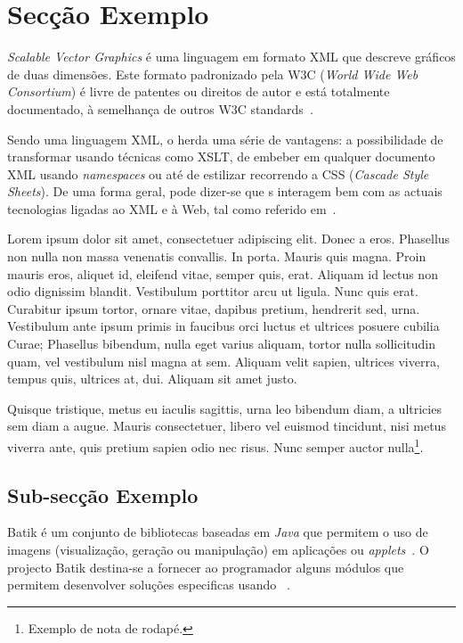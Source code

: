 \section{Secção Exemplo}\label{sec:dialecto}

\emph{Scalable Vector Graphics} é uma
linguagem em formato XML que descreve gráficos de duas dimensões. 
Este formato padronizado pela W3C (\emph{World Wide Web Consortium})
é livre de patentes ou direitos de autor e está totalmente
documentado, à semelhança de outros W3C
standards~\citep{kn:svgdoc}.

Sendo uma linguagem XML, o \svg{} herda uma série de vantagens: a
possibilidade de transformar \svg{} usando técnicas como
XSLT, de embeber \svg{} em qualquer documento
XML usando \textit{namespaces} ou até de  
estilizar \svg{} recorrendo a CSS (\emph{Cascade Style Sheets}). 
De uma forma geral, pode dizer-se que \svg{}s interagem bem com as
actuais tecnologias ligadas ao XML e à Web, tal como referido
em~\citep{kn:svgibm,kn:svgw3c}.

Lorem ipsum dolor sit amet, consectetuer adipiscing elit. Donec a
eros. Phasellus non nulla non massa venenatis convallis. In
porta. Mauris quis magna. Proin mauris eros, aliquet id, eleifend
vitae, semper quis, erat. Aliquam id lectus non odio dignissim
blandit. Vestibulum porttitor arcu ut ligula. Nunc quis
erat. Curabitur ipsum tortor, ornare vitae, dapibus pretium, hendrerit
sed, urna. Vestibulum ante ipsum primis in faucibus orci luctus et
ultrices posuere cubilia Curae; Phasellus bibendum, nulla eget varius
aliquam, tortor nulla sollicitudin quam, vel vestibulum nisl magna at
sem. Aliquam velit sapien, ultrices viverra, tempus quis, ultrices at,
dui. Aliquam sit amet justo. 

Quisque tristique, metus eu iaculis
sagittis, urna leo bibendum diam, a ultricies sem diam a augue. Mauris
consectetuer, libero vel euismod tincidunt, nisi metus viverra ante,
quis pretium sapien odio nec risus. Nunc semper auctor
nulla\footnote{Exemplo de nota de rodapé.}. 

\subsection{Sub-secção Exemplo} \label{batik} 

Batik é um conjunto de bibliotecas baseadas em \textit{Java} que
permitem o uso de imagens \svg{} (visualização, geração ou
manipulação) em aplicações ou \textit{applets}~\citep{kn:batik}.  
O projecto Batik destina-se a fornecer ao programador
alguns módulos que permitem desenvolver soluções especificas usando
\svg~\citep{kn:svgdoc}. 

